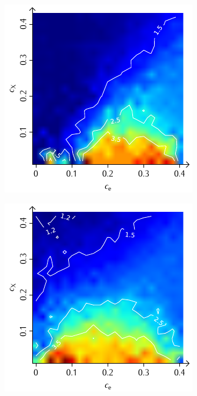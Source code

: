 \documentclass[a4paper, 10pt, twoside, openany]{book} %
\begin{document}
\begin{figure}
\begin{minipage}[t]{0.48\textwidth}
			\label{H_penalty_cluster_D}
		\end{minipage}
		\begin{minipage}[t]{0.48\textwidth}
			\includegraphics[width=\textwidth]{Abbildungen/Phasendiagramme/Konturen/H_random_D.pdf}
			\label{H_random_D}
		\end{minipage}
		\hfill
		\begin{minipage}[t]{0.48\textwidth}
			\includegraphics[width=\textwidth]{Abbildungen/Phasendiagramme/Konturen/H_penalty_random_D.pdf}

\end{minipage}
\end{figure}
\end{document}
